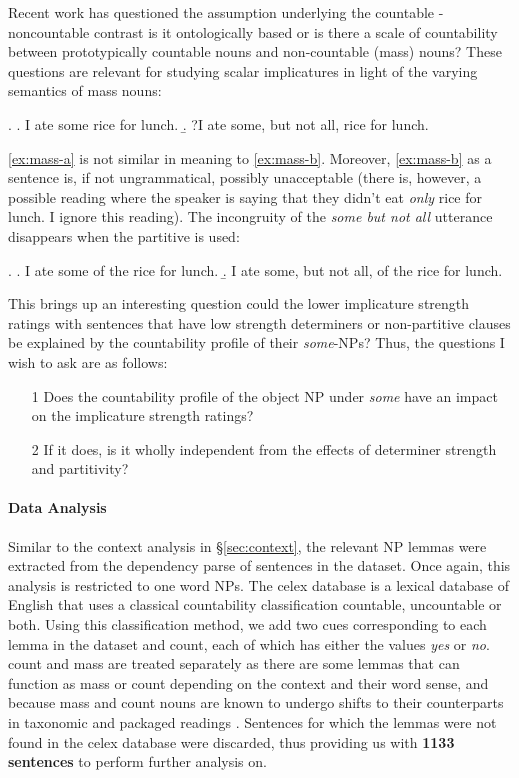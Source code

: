 \documentclass[10pt, biblatex]{report}
\begin{document}
Recent work has questioned the assumption underlying the countable - noncountable
contrast \citep{grimm2020, grimmgrammatical2018} \dash is it ontologically based
or is there a scale of countability between prototypically countable nouns and
non-countable (mass) nouns? These questions are relevant for studying scalar
implicatures in light of the varying semantics of mass nouns:

\ex. \a. I ate some rice for lunch.\label{ex:mass-a}
     \b. ?I ate some, but not all, rice for lunch.\label{ex:mass-b}

\ref{ex:mass-a} is not similar in meaning to \ref{ex:mass-b}. Moreover,
\ref{ex:mass-b} as a sentence is, if not ungrammatical, possibly unacceptable
(there is, however, a possible reading where the speaker is saying that they
didn't eat \textit{only} rice for lunch. I ignore this reading). The incongruity
of the \textit{some but not all} utterance disappears when the
partitive is used:

\ex. \a. I ate some of the rice for lunch.\label{ex:mass-p-a}
     \b. I ate some, but not all, of the rice for lunch. \label{ex:mass-p-b}

This brings up an interesting question \dash could the lower
implicature strength ratings with sentences that have low strength determiners or
non-partitive clauses be explained by the countability profile of their
\textit{some}-NPs? Thus, the questions I wish to ask are as follows:

\begin{enumerate}
    \item[1] Does the countability profile of the object NP under \textit{some}
          have an impact on the implicature strength ratings?
    \item[2] If it does, is it wholly independent from the effects of determiner strength and
          partitivity?
\end{enumerate}


\paragraph{Data Analysis} Similar to the context analysis in \S \ref{sec:context},
the relevant NP lemmas were extracted from the dependency parse of sentences in
the dataset. Once again, this analysis is restricted to one word NPs. The
{\rmsc celex} database \citep{celex2} is a lexical database of English that
uses a classical countability classification \dash countable, uncountable or both.
Using this classification method, we add two cues
corresponding to each lemma in the dataset  and
{\rmsc count}, each of which has either the values \textit{yes} or \textit{no}.
{\rmsc count} and {\rmsc mass} are treated separately as there are some lemmas
that can function as mass or count depending on the context and their word sense,
and because mass and count nouns are known to undergo shifts to their counterparts
in taxonomic and packaged readings \citep{moltmann2020}. Sentences for which the
lemmas were not found in the {\rmsc celex} database were discarded, thus providing us
with \textbf{1133 sentences} to perform further analysis on.
\end{document}
